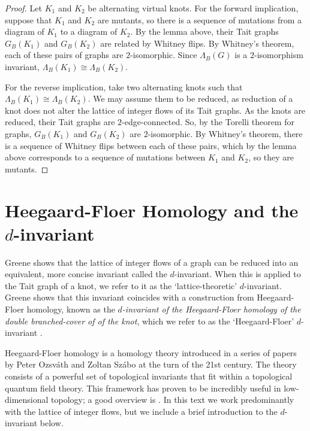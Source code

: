 \documentclass[12pt]{report}
\theoremstyle{upright}
\begin{document}
\begin{proof}
Let $K_{1}$ and $K_{2}$ be alternating virtual knots. For the forward implication, suppose that $K_{1}$ and $K_{2}$ are mutants, so there is a sequence of mutations from a diagram of $K_{1}$ to a diagram of $K_{2}$. By the lemma above, their Tait graphs $G_{B}(K_{1})$ and $G_{B}(K_{2})$  are related by Whitney flips. By Whitney's theorem, each of these pairs of graphs are $2$-isomorphic. Since $\Lambda_{B}(G)$ is a $2$-isomorphism invariant, $\Lambda_{B}(K_{1}) \cong \Lambda_{B}(K_{2})$.

For the reverse implication, take two alternating knots such that $\Lambda_{B}(K_{1}) \cong \Lambda_{B}(K_{2})$. We may assume them to be reduced, as reduction of a knot does not alter the lattice of integer flows of its Tait graphs. As the knots are reduced, their Tait graphs are $2$-edge-connected. So, by the Torelli theorem for graphs, $G_{B}(K_{1})$ and $G_{B}(K_{2})$ are $2$-isomorphic. By Whitney's theorem, there is a sequence of Whitney flips between each of these pairs, which by the lemma above corresponds to a sequence of mutations between $K_{1}$ and $K_{2}$, so they are mutants.
\end{proof}

\section{Heegaard-Floer Homology and the $d$-invariant}

Greene shows that the lattice of integer flows of a graph can be reduced into an equivalent, more concise invariant called the $d$-invariant. When this is applied to the Tait graph of a knot, we refer to it as the `lattice-theoretic' $d$-invariant. Greene shows that this invariant  coincides with a construction from Heegaard-Floer homology, known as the \textit{$d$-invariant of the Heegaard-Floer homology of the double branched-cover of of the knot}, which we refer to as the `Heegaard-Floer' $d$-invariant \cite{lattices-graphs-mutation}.

Heegaard-Floer homology is a homology theory introduced in a series of papers by Peter Ozsv\'ath and Zoltan Sz\'abo \cite{on-heegaard-floer-of-covers, hf-homology-alternating, holomorphic-disks-invariants} at the turn of the 21st century. The theory consists of a powerful set of topological invariants that fit within a topological quantum field theory. This framework has proven to be incredibly useful in low-dimensional topology; a good overview is \cite{heegaard-floer-homology}. In this text we work predominantly with the lattice of integer flows, but we include a brief introduction to the $d$-invariant below.
\end{document}

